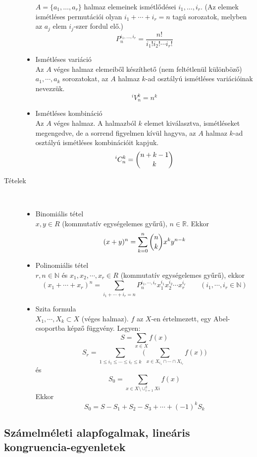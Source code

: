 \documentclass[margin=0px]{article}
\newcommand{\N}{\mathbb{N}}
\newcommand{\R}{\mathbb{R}}
\begin{document}
\begin{description}
\begin{itemize}
					 		$A = \{a_1,\dotsc,a_r\}$ halmaz elemeinek ismétlődései $i_1,\dotsc,i_r$. (Az elemek ismétléses permutációi olyan $i_1+\cdots+i_r = n$ tagú sorozatok, melyben az $a_j$ elem $i_j$-szer fordul elő.)
					 		\[P_n^{i_1,\dotsc,i_r} = \frac{n!}{i_1!i_2!\cdots i_r!}\]
				 		\item Ismétléses variáció \\
					 		Az $A$ véges halmaz elemeiből készíthető (nem feltétlenül különböző)  $a_1,\cdots,a_k$ sorozatokat, az $A$ halmaz $k$-ad osztályú ismétléses variációinak nevezzük.
					 		\[^iV_n^k = n^k\]
				 		\item Ismétléses kombináció \\
					 		Az $A$ véges halmaz. A halmazból $k$ elemet kiválasztva, ismétléseket megengedve, de a sorrend figyelmen kívül hagyva, az $A$ halmaz $k$-ad osztályú ismétléses kombinációit kapjuk.
					 		\[^iC_n^k = \dbinom{n+k-1}{k} \]
				 	\end{itemize}
				 	\item[Tételek] \hfill \\
					 	\begin{itemize}
					 		\item Binomiális tétel \\
						 		$x,y \in R$  (kommutatív egységelemes gyűrű), $n\in\R$. Ekkor
						 		\[(x+y)^n = \sum\limits_{k=0}^n\dbinom{n}{k}x^ky^{n-k} \]
					 		\item Polinomiális tétel \\
						 		$r,n\in\N$ és $x_1, x_2, \cdots, x_r \in R$ (kommutatív egységelemes gyűrű), ekkor
						 		\[(x_1+\cdots+x_r)^n = \sum\limits_{i_1+\cdots+i_r = n}P_n^{i_1,\cdots,i_r}x_1^{i_1}x_2^{i_2}\cdots x_r^{i_r} \qquad (i_1,\cdots,i_r \in\N)\]
					 		\item Szita formula \\
					 		$X_1,\cdots,X_k \subset X$ (véges halmaz). $f$ az $X$-en értelmezett, egy Abel-csoportba képző függvény. Legyen:
					 		\[S=\sum\limits_{x\in X}f(x)\]
					 		\[ S_r = \sum\limits_{1\leq i_1 \leq \cdots \leq i_r \leq k}\Bigg(\sum\limits_{x \in X_{i_1} \cap \cdots \cap X_{i_r}}f(x)\Bigg) \]
					 		és
					 		\[S_0 = \sum\limits_{x\in X \setminus \cup_{i=1}^k Xi}f(x)\]
					 		Ekkor
					 		\[S_0 = S - S_1+S_2-S_3+\cdots+(-1)^kS_k \]
					 	\end{itemize}
				 \end{description}
		\subsection{Számelméleti alapfogalmak, lineáris kongruencia-egyenletek}
\end{document}
